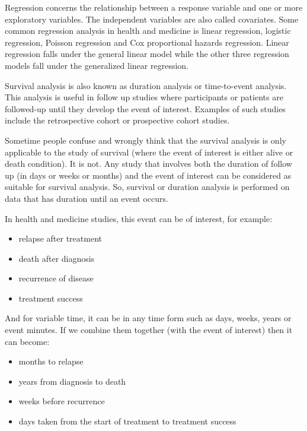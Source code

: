 \documentclass[
  10pt,
]{krantz}
\providecommand{\tightlist}{%
  \setlength{\itemsep}{0pt}\setlength{\parskip}{0pt}}
\begin{document}
Regression concerns the relationship between a response variable and one or more exploratory variables. The independent variables are also called covariates. Some common regression analysis in health and medicine is linear regression, logistic regression, Poisson regression and Cox proportional hazards regression. Linear regression falls under the general linear model while the other three regression models fall under the generalized linear regression.

Survival analysis is also known as duration analysis or time-to-event analysis. This analysis is useful in follow up studies where participants or patients are followed-up until they develop the event of interest. Examples of such studies include the retrospective cohort or prospective cohort studies.

Sometime people confuse and wrongly think that the survival analysis is only applicable to the study of survival (where the event of interest is either alive or death condition). It is not. Any study that involves both the duration of follow up (in days or weeks or months) and the event of interest can be considered as suitable for survival analysis. So, survival or duration analysis is performed on data that has duration until an event occurs.

In health and medicine studies, this event can be of interest, for example:

\begin{itemize}
\tightlist
\item
  relapse after treatment
\item
  death after diagnosis
\item
  recurrence of disease
\item
  treatment success
\end{itemize}

And for variable time, it can be in any time form such as days, weeks, years or event minutes. If we combine them together (with the event of interest) then it can become:

\begin{itemize}
\tightlist
\item
  months to relapse
\item
  years from diagnosis to death
\item
  weeks before recurrence
\item
  days taken from the start of treatment to treatment success
\end{itemize}
\end{document}
